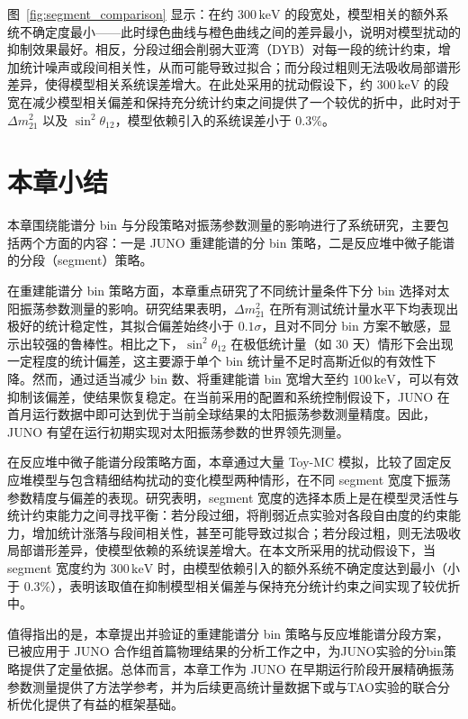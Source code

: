 图~\ref{fig:segment_comparison} 显示：在约 $300\,\mathrm{keV}$ 的段宽处，模型相关的额外系统不确定度最小——此时绿色曲线与橙色曲线之间的差异最小，说明对模型扰动的抑制效果最好。相反，分段过细会削弱大亚湾（DYB）对每一段的统计约束，增加统计噪声或段间相关性，从而可能导致过拟合；而分段过粗则无法吸收局部谱形差异，使得模型相关系统误差增大。在此处采用的扰动假设下，约 $300\,\mathrm{keV}$ 的段宽在减少模型相关偏差和保持充分统计约束之间提供了一个较优的折中，此时对于 $\Delta m_{21}^2$ 以及 $\sin^2\theta_{12}$，模型依赖引入的系统误差小于 0.3\%。


\section{本章小结}
\label{sec:ch4_summary}

本章围绕能谱分 bin 与分段策略对振荡参数测量的影响进行了系统研究，主要包括两个方面的内容：一是 JUNO 重建能谱的分 bin 策略，二是反应堆中微子能谱的分段（segment）策略。

在重建能谱分 bin 策略方面，本章重点研究了不同统计量条件下分 bin 选择对太阳振荡参数测量的影响。研究结果表明，$\Delta m^2_{21}$ 在所有测试统计量水平下均表现出极好的统计稳定性，其拟合偏差始终小于 $0.1\sigma$，且对不同分 bin 方案不敏感，显示出较强的鲁棒性。相比之下，$\sin^2\theta_{12}$ 在极低统计量（如 30 天）情形下会出现一定程度的统计偏差，这主要源于单个 bin 统计量不足时高斯近似的有效性下降。然而，通过适当减少 bin 数、将重建能谱 bin 宽增大至约 $100\,\mathrm{keV}$，可以有效抑制该偏差，使结果恢复稳定。在当前采用的配置和系统控制假设下，JUNO 在首月运行数据中即可达到优于当前全球结果的太阳振荡参数测量精度。因此，JUNO 有望在运行初期实现对太阳振荡参数的世界领先测量。

在反应堆中微子能谱分段策略方面，本章通过大量 Toy-MC 模拟，比较了固定反应堆模型与包含精细结构扰动的变化模型两种情形，在不同 segment 宽度下振荡参数精度与偏差的表现。研究表明，segment 宽度的选择本质上是在模型灵活性与统计约束能力之间寻找平衡：若分段过细，将削弱近点实验对各段自由度的约束能力，增加统计涨落与段间相关性，甚至可能导致过拟合；若分段过粗，则无法吸收局部谱形差异，使模型依赖的系统误差增大。在本文所采用的扰动假设下，当 segment 宽度约为 $300\,\mathrm{keV}$ 时，由模型依赖引入的额外系统不确定度达到最小（小于 $0.3\%$），表明该取值在抑制模型相关偏差与保持充分统计约束之间实现了较优折中。

值得指出的是，本章提出并验证的重建能谱分 bin 策略与反应堆能谱分段方案，已被应用于 JUNO 合作组首篇物理结果的分析工作之中，为JUNO实验的分bin策略提供了定量依据。总体而言，本章工作为 JUNO 在早期运行阶段开展精确振荡参数测量提供了方法学参考，并为后续更高统计量数据下或与TAO实验的联合分析优化提供了有益的框架基础。

